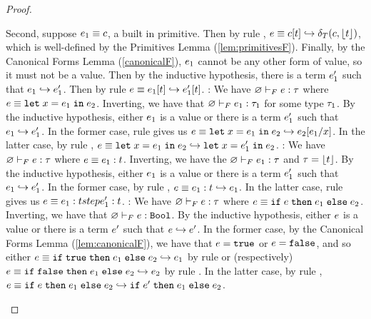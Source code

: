 \begin{proof}
\begin{itemize}
  Second, suppose $e_1 \equiv c$, a built in primitive.
  Then by rule \eTPrim, 
  $e \equiv  c[t] \hookrightarrow \delta_T(c,\lfloor{\ensuremath{t}}\rfloor)$,
  which is well-defined by the Primitives Lemma (\ref{lem:primitivesF}).
  Finally, by the Canonical Forms Lemma (\ref{canonicalF}), 
  $e_1$ cannot be any other
  form of value, so it must not be a value. 
  Then by the inductive hypothesis,
  there is a term $e'_1$ such that $e_1 \hookrightarrow e'_1$. 
  Then by rule \eTApp
  $e \equiv e_1[t] \hookrightarrow e'_1[t]$.
  \pfcase{\fLet}: We have 
  ${\varnothing} \vdash_F {e} : {\tau}$ where
  $e \equiv {{\texttt{let}}}\;x{{\;=\;}}e_1\;{{\texttt{in}}}\;e_2$. Inverting,
  we have that ${\varnothing} \vdash_F {e_1} : {\tau_1}$
  for some type $\tau_1$. 
  By the inductive hypothesis, either $e_1$ is a value
  or there is a term $e'_1$ such that $e_1 \hookrightarrow e'_1$.
  In the former case, rule \eLetV gives us
  $e \equiv \eletin{x}{\sexpr_1}{\sexpr_2} \step \subst{\sexpr_2}{x}{\sexpr_1}$.
  In the latter case, by rule \eLet, 
  $e \equiv {{\texttt{let}}}\;x{{\;=\;}}e_1\;{{\texttt{in}}}\;e_2 \hookrightarrow {{\texttt{let}}}\;x{{\;=\;}}e'_1\;{{\texttt{in}}}\;e_2$.
  \pfcase{\fAnn}: We have 
  ${\varnothing} \vdash_F {e} : {\tau}$ where
  $e \equiv e_1 : t$. Inverting,
  we have the ${\varnothing} \vdash_F {e_1} : {\tau}$ and
  $\tau = \lfloor{\ensuremath{t}}\rfloor$. 
  By the inductive hypothesis, either $e_1$ is a value
  or there is a term $e'_1$ such that $e_1 \hookrightarrow e'_1$.
  In the former case, by rule \eAnnV, 
  $e \equiv e_1 : t \hookrightarrow e_1$.
  In the latter case, rule \eAnn gives us 
  $e \equiv e_1 : t step e'_1 : t$.
   \pfcase{\fIf}: We have 
   ${\varnothing} \vdash_F {e} : {\tau}$ where
   $e \equiv {{\texttt{if}}}\;{e}\;{{\texttt{then}}}\;{e_1}\;{{\texttt{else}}}\;{e_2}$. Inverting,
   we have that ${\varnothing} \vdash_F {e} : {\texttt{Bool}}$.
   By the inductive hypothesis, either $e$ is a value
   or there is a term $e'$ such that $e \hookrightarrow e'$.
   In the former case, by the Canonical Forms Lemma (\ref{lem:canonicalF}),
   we have that $e = \mathtt{true}$ or $e = \mathtt{false}$, and so
   either 
   $e \equiv {{\texttt{if}}}\;{\mathtt{true}}\;{{\texttt{then}}}\;{e_1}\;{{\texttt{else}}}\;{e_2} \hookrightarrow e_1$
   by rule \eIfT or (respectively)
   $e \equiv {{\texttt{if}}}\;{\mathtt{false}}\;{{\texttt{then}}}\;{e_1}\;{{\texttt{else}}}\;{e_2} \hookrightarrow e_2$
   by rule \eIfF.
   In the latter case, by rule \eIf, 
   $e \equiv {{\texttt{if}}}\;{e}\;{{\texttt{then}}}\;{e_1}\;{{\texttt{else}}}\;{e_2} \hookrightarrow {{\texttt{if}}}\;{e'}\;{{\texttt{then}}}\;{e_1}\;{{\texttt{else}}}\;{e_2}$.
  \end{itemize}
  \end{proof}

